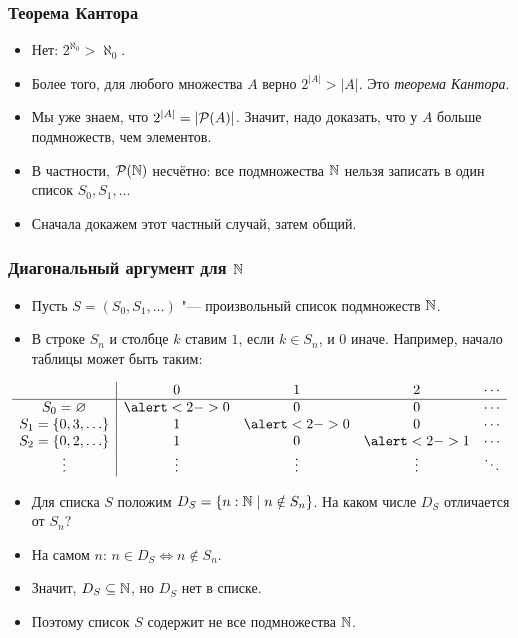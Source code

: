 \documentclass[10pt]{beamer}
\begin{document}
\begin{frame}
    \frametitle{Теорема Кантора}
    \begin{itemize}
        \item Нет: $2^{\aleph_0}>\aleph_0$.
        \pause
        \item Более того, для любого множества $A$ верно $2^{|A|}>|A|$. Это \emph{теорема Кантора}.
        \item Мы уже знаем, что $2^{|A|}=|\mathcal{P}({A})|$. Значит, надо доказать, что у $A$ больше подмножеств, чем элементов.
        \pause
        \item В частности, $\mathcal{P}({\mathbb{N}})$ несчётно: все подмножества $\mathbb{N}$ нельзя записать в один список $S_0,S_1,\ldots$
        \item Сначала докажем этот частный случай, затем общий.
    \end{itemize}
\end{frame}

\begin{frame}
    \frametitle{Диагональный аргумент для $\mathbb{N}$}
    \begin{itemize}
        \item Пусть $S=(S_0,S_1,\ldots)$ "--- произвольный список подмножеств $\mathbb{N}$.
        \item В строке $S_n$ и столбце $k$ ставим $1$, если $k\in S_n$, и $0$ иначе. Например, начало таблицы может быть таким:
    \end{itemize}
    \[
    \begin{array}{c|cccc}
           &0&1&2&\cdots\\\hline
        S_0=\varnothing&\alert<2->{0}&0&0&\cdots\\
        S_1=\{0,3,\ldots\}&1&\alert<2->{0}&0&\cdots\\
        S_2=\{0,2,\ldots\}&1&0&\alert<2->{1}&\cdots\\
        \vdots&\vdots&\vdots&\vdots&\ddots
    \end{array}
    \]
    \begin{itemize}
        \pause
        \item Для списка $S$ положим $D_S=\{n:\mathbb{N}\mid n\notin S_n\}$. На каком числе $D_S$ отличается от $S_n$?
        \pause
        \item На самом $n$: $n\in D_S\iff n\notin S_n$.
        \item Значит, $D_S\subseteq\mathbb{N}$, но $D_S$ нет в списке.
        \pause
        \item Поэтому список $S$ содержит не все подмножества $\mathbb{N}$.
    \end{itemize}
\end{frame}
\end{document}
